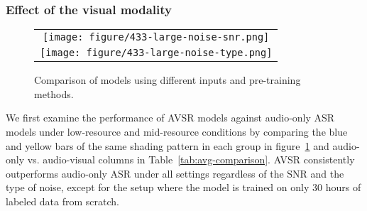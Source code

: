 \subsubsection{Effect of the visual modality}

\begin{figure}[htb]
\caption{\label{fig:overall-comparison}Comparison of models using different inputs and pre-training methods.}
\begin{tabular}{c}
  \texttt{[image: figure/433-large-noise-snr.png]}\\ \texttt{[image: figure/433-large-noise-type.png]}
\end{tabular}
\end{figure}

\begin{table}[htb]
    \centering
    \caption{Comparison among models with different pre-training configurations and input modalities. C: clean audio, N: noisy audio. The N-WER is averaged over 4 noise types and 5 SNRs.}\label{tab:avg-comparison}
\end{table} We first examine the performance of AVSR models against audio-only ASR models under low-resource and mid-resource conditions by comparing the blue and yellow bars of the same shading pattern in each group in figure~\ref{fig:overall-comparison} and audio-only vs. audio-visual columns in Table~\ref{tab:avg-comparison}. AVSR consistently outperforms audio-only ASR under all settings regardless of the SNR and the type of noise, except for the setup where the model is trained on only 30 hours of labeled data from scratch.


